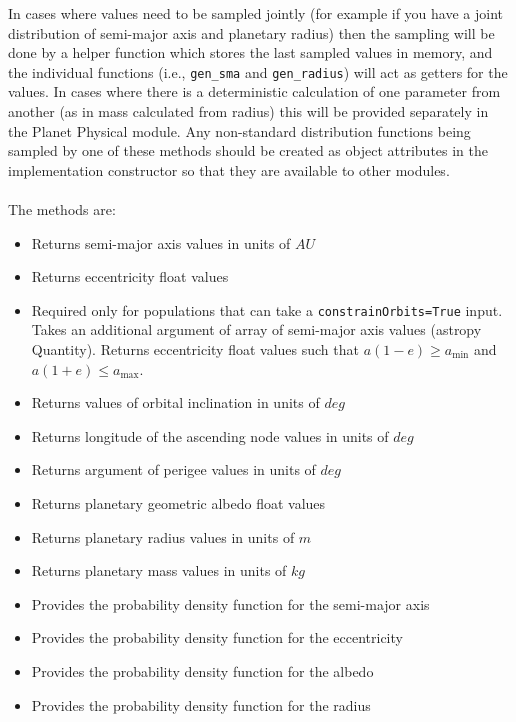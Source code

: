\documentclass[cleanfoot]{asme2ej}
\begin{document}
In cases where values need to be sampled jointly (for example if you have a joint distribution of semi-major axis and planetary radius) then the sampling will be done by a helper function which stores the last sampled values in memory, and the individual functions (i.e., \verb+gen_sma+ and \verb+gen_radius+) will act as getters for the values.  In cases where there is a deterministic calculation of one parameter from another (as in mass calculated from radius) this will be provided separately in the Planet Physical module. Any non-standard distribution functions being sampled by one of these methods should be created as object attributes in the implementation constructor so that they are available to other modules.
\\\\
The methods are:
\begin{itemize}[leftmargin=1.5in,font={\ttfamily}]
    \item[\texttt gen\_sma] Returns semi-major axis values in units of $ AU $
    \item[\texttt gen\_eccen] Returns eccentricity float values
    \item[\texttt gen\_eccen\_from\_sma] Required only for populations that can take a \verb+constrainOrbits=True+ input. Takes an additional argument of array of semi-major axis values (astropy Quantity). Returns eccentricity float values such that $a(1-e) \ge  a_\textrm{min}$ and $a(1+e) \le a_\textrm{max}$.
    \item[\texttt gen\_I] Returns values of orbital inclination in units of $ deg $
    \item[\texttt gen\_O] Returns longitude of the ascending node values in units of $ deg $
    \item[\texttt gen\_w] Returns argument of perigee values in units of $ deg $
    \item[\texttt gen\_albedo] Returns planetary geometric albedo float values
    \item[\texttt gen\_radius] Returns planetary radius values  in units of $ m $
    \item[\texttt gen\_mass] Returns planetary mass values in units of $ kg $
    \item[\texttt dist\_sma] Provides the probability density function for the semi-major axis
    \item[\texttt dist\_eccen] Provides the probability density function for the eccentricity
    \item[\texttt dist\_albedo] Provides the probability density function for the albedo
    \item[\texttt dist\_radius] Provides the probability density function for the radius
\end{itemize}
\end{document}
